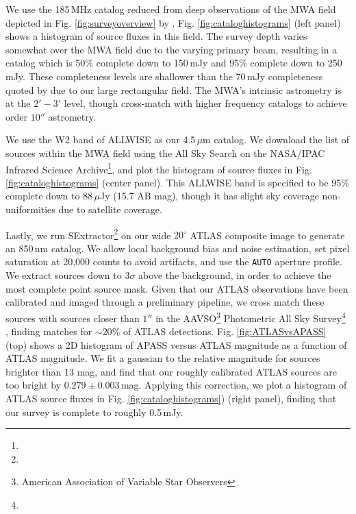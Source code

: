 \documentclass[numberedappendix]{emulateapj}
\begin{document}
We use the 185\,MHz catalog reduced from deep observations of the MWA field depicted in Fig. \ref{fig:surveyoverview} by \citet{PattiCatalog1}. Fig. \ref{fig:cataloghistograms} (left panel) shows a histogram of source fluxes in this field. The survey depth varies somewhat over the MWA field due to the varying primary beam, resulting in a catalog which is 50\% complete down to 150\,mJy and 95\% complete down to 250\,mJy. These completeness levels are shallower than the 70\,mJy completeness quoted by \citet{PattiCatalog1} due to our large rectangular field. The MWA's intrinsic astrometry is at the $2'-3'$ level, though \citep{PattiCatalog1} cross-match with higher frequency catalogs to achieve order $10''$ astrometry. 

We use the W2 band of ALLWISE \citep{Wright2010,allwise} as our 4.5\,$\mu$m catalog. We download the list of sources within the MWA field using the All Sky Search on the NASA/IPAC Infrared Science Archive\footnote{}, and plot the histogram of source fluxes in Fig. \ref{fig:cataloghistograms} (center panel). This ALLWISE band is specified to be 95\% complete down to 88\,$\mu$Jy (15.7 AB mag), though it has slight sky coverage non-uniformities due to satellite coverage.

Lastly, we run SExtractor\footnote{} \citep{sextractor} on our wide $20^\circ$ ATLAS composite image to generate an 850\,nm catalog. We allow local background bias and noise estimation, set pixel saturation at 20,000 counts to avoid artifacts, and use the {\tt AUTO} aperture profile. We extract sources down to $3\sigma$ above the background, in order to achieve the most complete point source mask. Given that our ATLAS observations have been calibrated and imaged through a preliminary pipeline, we cross match these sources with sources closer than $1''$ in the AAVSO\footnote{American Association of Variable Star Observers} Photometric All Sky Survey\footnote{} \citep{apass}, finding matches for $\sim20\%$ of ATLAS detections. Fig. \ref{fig:ATLASvsAPASS} (top) shows a 2D histogram of APASS versus ATLAS magnitude as a function of ATLAS magnitude. We fit a gaussian to the relative magnitude for sources brighter than 13 mag, and find that our roughly calibrated ATLAS sources are too bright by $0.279\pm0.003$\,mag. Applying this correction, we plot a histogram of ATLAS source fluxes in Fig. \ref{fig:cataloghistograms}) (right panel), finding that our survey is complete to roughly 0.5\,mJy.
\end{document}
